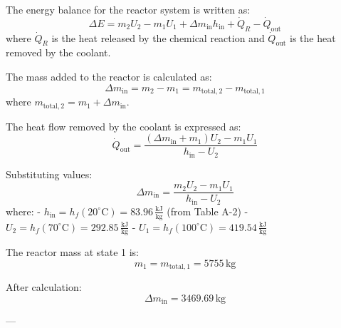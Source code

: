 The energy balance for the reactor system is written as:  
\[
\Delta E = m_2 U_2 - m_1 U_1 + \Delta m_{\text{in}} h_{\text{in}} + \dot{Q}_{R} - \dot{Q}_{\text{out}}
\]  
where \( \dot{Q}_{R} \) is the heat released by the chemical reaction and \( \dot{Q}_{\text{out}} \) is the heat removed by the coolant.  

The mass added to the reactor is calculated as:  
\[
\Delta m_{\text{in}} = m_2 - m_1 = m_{\text{total},2} - m_{\text{total},1}
\]  
where \( m_{\text{total},2} = m_1 + \Delta m_{\text{in}} \).  

The heat flow removed by the coolant is expressed as:  
\[
\dot{Q}_{\text{out}} = \frac{(\Delta m_{\text{in}} + m_1) U_2 - m_1 U_1}{h_{\text{in}} - U_2}
\]  

Substituting values:  
\[
\Delta m_{\text{in}} = \frac{m_2 U_2 - m_1 U_1}{h_{\text{in}} - U_2}
\]  
where:  
- \( h_{\text{in}} = h_f(20^\circ\text{C}) = 83.96 \, \frac{\text{kJ}}{\text{kg}} \) (from Table A-2)  
- \( U_2 = h_f(70^\circ\text{C}) = 292.85 \, \frac{\text{kJ}}{\text{kg}} \)  
- \( U_1 = h_f(100^\circ\text{C}) = 419.54 \, \frac{\text{kJ}}{\text{kg}} \)  

The reactor mass at state 1 is:  
\[
m_1 = m_{\text{total},1} = 5755 \, \text{kg}
\]  

After calculation:  
\[
\Delta m_{\text{in}} = 3469.69 \, \text{kg}
\]  

---